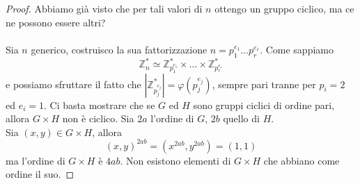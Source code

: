 \begin{proof}
	Abbiamo già visto che per tali valori di $n$ ottengo un gruppo ciclico, ma ce ne possono essere altri?\\ \\
	Sia $n$ generico, costruisco la sua fattorizzazione $n=p_1^{e_1}\dots p_r^{e_r}$. Come sappiamo
	\begin{equation*}
	\mathbb{Z}_n^*\simeq\mathbb{Z}_{p_1^{e_1}}^*\times\dots\times\mathbb{Z}_{p_r^{e_r}}^*
	\end{equation*}
	e possiamo sfruttare il fatto che $\left|\mathbb{Z}_{p_j^{e_j}}^*\right|=\varphi\left(p_j^{e_j}\right)$, sempre pari tranne per $p_i=2$ ed $e_i=1$. Ci basta mostrare che se $G$ ed $H$ sono gruppi ciclici di ordine pari, allora $G\times H$ non è ciclico. Sia $2a$ l'ordine di $G$, $2b$ quello di $H$. \\ Sia $(x,y)\in G\times H$, allora
	\begin{equation*}
	(x,y)^{2ab}=(x^{2ab},y^{2ab})=(1,1)
	\end{equation*}
	ma l'ordine di $G\times H$ è $4ab$. Non esistono elementi di $G\times H$ che abbiano come ordine il suo.
\end{proof}




\label{lezione8}
